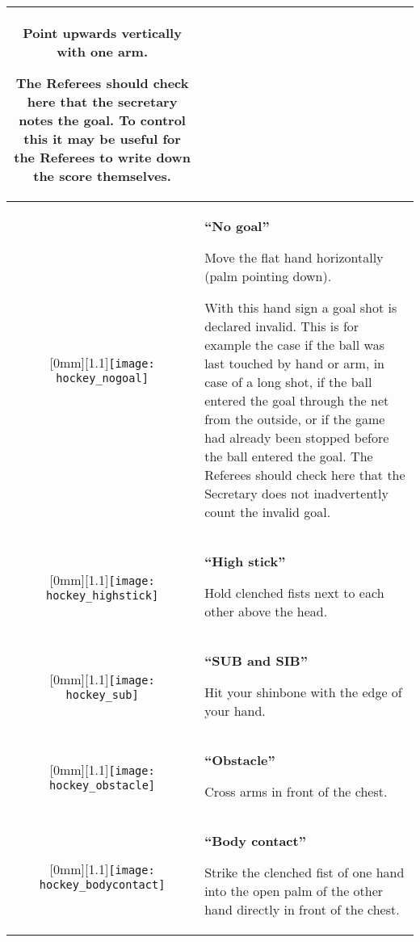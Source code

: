 \begin{longtable}{|c|p{10.8cm}|}
Point upwards vertically with one arm.

The Referees should check here that the secretary notes the goal.
To control this it may be useful for the Referees to write down the score themselves.\\

\hline %

\raisebox{-\height}[0mm][1.1\height]{\texttt{[image: hockey\_nogoal]}}
&
\textbf{``No goal''}

Move the flat hand horizontally (palm pointing down).

With this hand sign a goal shot is declared invalid.
This is for example the case if the ball was last touched by hand or arm, in case of a long shot, if the ball entered the goal through the net from the outside, or if the game had already been stopped before the ball entered the goal.
The Referees should check here that the Secretary does not inadvertently count the invalid goal.\\

\hline %

\raisebox{-\height}[0mm][1.1\height]{\texttt{[image: hockey\_highstick]}}
&
\textbf{``High stick''}

Hold clenched fists next to each other above the head.\\

\hline %

\raisebox{-\height}[0mm][1.1\height]{\texttt{[image: hockey\_sub]}}
  &
\textbf{``SUB and SIB''}

Hit your shinbone with the edge of your hand.\\

\hline %

\raisebox{-\height}[0mm][1.1\height]{\texttt{[image: hockey\_obstacle]}}
  &
\textbf{``Obstacle''}

Cross arms in front of the chest.\\

\hline %

\raisebox{-\height}[0mm][1.1\height]{\texttt{[image: hockey\_bodycontact]}}
  &
\textbf{``Body contact''}

Strike the clenched fist of one hand into the open palm of the other hand directly in front of the chest.\\


\end{longtable}
